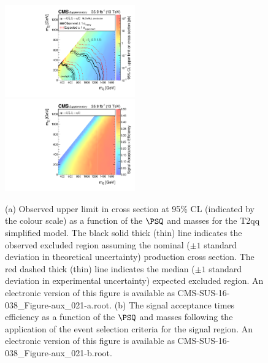 \begin{figure}
    \begin{center}
            \includegraphics[width=0.50\textwidth]{Supplementary/CMS-SUS-16-038_Figure-aux_021-a}
            \includegraphics[width=0.50\textwidth]{Supplementary/CMS-SUS-16-038_Figure-aux_021-b}
        \caption{ (a) Observed upper limit in cross section at 95\% CL (indicated
        by the colour scale) as a function of 
        the $\PSQ$ and \PSGczDo %
        masses for the 
        T2qq %
        simplified  model.  The  black  solid thick  (thin)  line indicates  the
        observed  excluded  region  assuming   the  nominal  (${\pm}1$  standard
        deviation in theoretical uncertainty)  production cross section. The red
        dashed  thick  (thin)  line  indicates  the  median  (${\pm}1$  standard
        deviation in experimental uncertainty) expected excluded region.
    An electronic version of this figure is available as CMS-SUS-16-038\_Figure-aux\_021-a.root.
        (b) The signal acceptance times efficiency as a function of 
        the $\PSQ$ and \PSGczDo %
        masses following the application of the event selection criteria for the signal region.
    An electronic version of this figure is available as CMS-SUS-16-038\_Figure-aux\_021-b.root.
        }
        \label{fig:T2qq}
    \end{center}
\end{figure}


